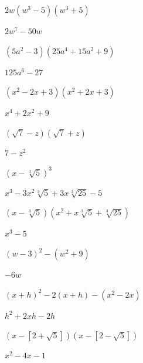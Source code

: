 \documentclass{ximera}
\begin{document}
\begin{question}
\begin{problem}
$2w(w^3-5)(w^3+5)$

\begin{solution}
    $2w^7 - 50w$
\end{solution}
\end{problem}

\begin{problem}
$(5a^2 - 3)(25a^4 + 15a^2 + 9)$

\begin{solution}
    $125a^6 - 27$
\end{solution}
\end{problem}

\begin{problem}
$(x^2-2x+3)(x^2+2x+3)$

\begin{solution}
    $x^4+2x^2+9$
\end{solution}
\end{problem}

\begin{problem}
$(\sqrt{7} - z)(\sqrt{7} + z)$

\begin{solution}
    $7-z^2$
\end{solution}
\end{problem}

\begin{problem}
$(x - \sqrt[3]{5})^3$

\begin{solution}
    $x^3 - 3x^2\sqrt[3]{5} + 3x\sqrt[3]{25} - 5$
\end{solution}
\end{problem}

\begin{problem}
$(x - \sqrt[3]{5})(x^2 + x\sqrt[3]{5} + \sqrt[3]{25})$

\begin{solution}
    $x^3 - 5$
\end{solution}
\end{problem}

\begin{problem}
$(w-3)^2 - (w^2 + 9)$

\begin{solution}
    $-6w$
\end{solution}
\end{problem}

\begin{problem}
$(x+h)^2 - 2(x+h) - (x^2 - 2x)$

\begin{solution}
    $h^2 + 2xh - 2h$
\end{solution}
\end{problem}

\begin{problem}\label{polyarithexlast}
$(x-[2+\sqrt{5}])(x-[2-\sqrt{5}])$

\begin{solution}
    $x^2 - 4x - 1$
\end{solution}
\end{problem}
\end{question}
\end{document}
